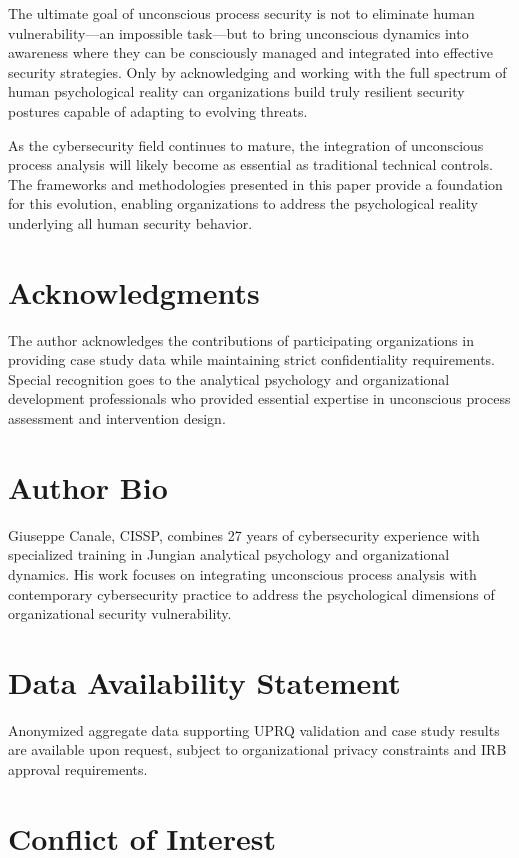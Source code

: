 \documentclass[11pt,a4paper]{article}
\begin{document}
The ultimate goal of unconscious process security is not to eliminate human vulnerability—an impossible task—but to bring unconscious dynamics into awareness where they can be consciously managed and integrated into effective security strategies. Only by acknowledging and working with the full spectrum of human psychological reality can organizations build truly resilient security postures capable of adapting to evolving threats.

As the cybersecurity field continues to mature, the integration of unconscious process analysis will likely become as essential as traditional technical controls. The frameworks and methodologies presented in this paper provide a foundation for this evolution, enabling organizations to address the psychological reality underlying all human security behavior.

\section*{Acknowledgments}

The author acknowledges the contributions of participating organizations in providing case study data while maintaining strict confidentiality requirements. Special recognition goes to the analytical psychology and organizational development professionals who provided essential expertise in unconscious process assessment and intervention design.

\section*{Author Bio}

Giuseppe Canale, CISSP, combines 27 years of cybersecurity experience with specialized training in Jungian analytical psychology and organizational dynamics. His work focuses on integrating unconscious process analysis with contemporary cybersecurity practice to address the psychological dimensions of organizational security vulnerability.

\section*{Data Availability Statement}

Anonymized aggregate data supporting UPRQ validation and case study results are available upon request, subject to organizational privacy constraints and IRB approval requirements.

\section*{Conflict of Interest}
\end{document}
